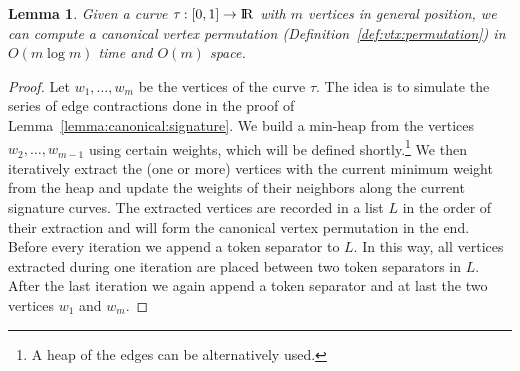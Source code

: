 \documentclass[11pt, letter]{article}
\newtheorem{lemma}[theorem]{Lemma}
\newcommand{\lemlab}[1]{\label{lemma:#1}}
\newcommand{\lemref}[1]{Lemma~\ref{lemma:#1}}
\newcommand{\defref}[1]{Definition~\ref{def:#1}}
\renewcommand{\Re}{{\rm I\!\hspace{-0.025em} R}}
\newcommand{\trajectory}[2]{\ensuremath{{#1}_{#2}}}
\newcommand{\inputSym}{\ensuremath{\tau}}
\newcommand{\inputTraj}[1]{\trajectory{\inputSym}{#1}}
\begin{document}
\begin{lemma}\lemlab{compute:vtx:permutation}
Given a curve  $\inputTraj{}:[0,1]\rightarrow\Re$ with $m$ vertices
in general position, we can compute a canonical vertex permutation (\defref{vtx:permutation}) in $O(m \log m)$ time and $O(m)$ space.
\end{lemma}
\begin{proof}
Let $w_1,\ldots,w_m$ be the vertices of the curve $\tau$.
The idea is to simulate the series of edge contractions done in the proof of \lemref{canonical:signature}. We build a min-heap from the vertices $w_2,\dots,w_{m-1}$ using certain weights, which will be defined shortly.\footnote{A heap of the edges can be alternatively used.} We then iteratively extract the (one or more) vertices with the current minimum weight from the heap and update the weights of their neighbors along the current signature curves. The extracted vertices are recorded in a list $L$ in the order of their extraction and will form the canonical vertex permutation in the end. Before every iteration we append a token separator to $L$. In this way, all vertices extracted during one iteration are placed between two token separators in $L$. After the last iteration we again append a token separator and at last the two vertices $w_1$ and $w_m$.


\end{proof}
\end{document}
